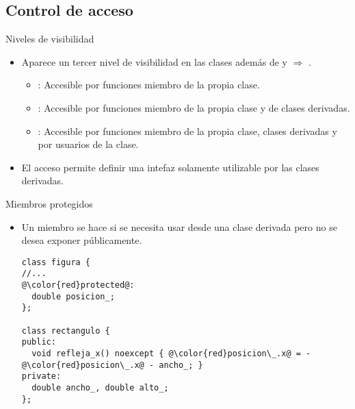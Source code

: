 \subsection{Control de acceso}

\begin{frame}[t,fragile]{Niveles de visibilidad}
\begin{itemize}
  \item Aparece un tercer nivel de visibilidad en las clases además de
         y  $\Rightarrow$ .
    \begin{itemize}
      \item {}:
            Accesible por funciones miembro de la propia clase.
      \item {}:
            Accesible por funciones miembro de la propia clase y de clases derivadas.
      \item {}:
            Accesible por funciones miembro de la propia clase, clases derivadas y
            por usuarios de la clase.
    \end{itemize}

  \item El acceso  permite definir una intefaz
        solamente utilizable por las clases derivadas.
\end{itemize}
\end{frame}

\begin{frame}[t,fragile]{Miembros protegidos}
\begin{itemize}
  \item Un miembro se hace  si se necesita usar
        desde una clase derivada pero no se desea exponer
        públicamente.

\begin{lstlisting}[escapechar=@]
class figura {
//...
@\color{red}protected@:
  double posicion_;
};

class rectangulo {
public:
  void refleja_x() noexcept { @\color{red}posicion\_.x@ = -@\color{red}posicion\_.x@ - ancho_; }
private:
  double ancho_, double alto_;
};
\end{lstlisting}
\end{itemize}
\end{frame}

